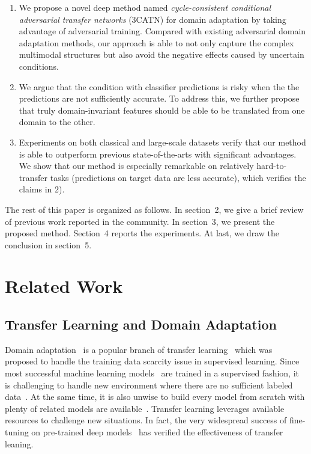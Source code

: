 \documentclass[sigconf]{acmart}
\begin{document}
\begin{enumerate}[1)]
\item We propose a novel deep method named {\it cycle-consistent conditional adversarial transfer networks} (3CATN) for domain adaptation by taking advantage of adversarial training. Compared with existing adversarial domain adaptation methods, our approach is able to not only capture the complex multimodal structures but also avoid the negative effects caused by uncertain conditions.
\item We argue that the condition with classifier predictions is risky when the the predictions are not sufficiently accurate. To address this, we further propose that truly domain-invariant features should be able to be translated from one domain to the other.
\item Experiments on both classical and large-scale datasets verify that our method is able to outperform previous state-of-the-arts with significant advantages. We show that our method is especially remarkable on relatively hard-to-transfer tasks (predictions on target data are less accurate), which verifies the claims in 2).
\end{enumerate}

The rest of this paper is organized as follows. In section~2, we give a brief review of previous work reported in the community. In section~3, we present the proposed method. Section~4 
reports the experiments. At last, we draw the conclusion in section~5.

\section{Related Work}


\subsection{Transfer Learning and Domain Adaptation}
Domain adaptation~\cite{pan2011domain,ganin2014unsupervised,li2016joint,bousmalis2017unsupervised,long2018conditional,li2019locality} is a popular branch of transfer learning~\cite{pan2010survey,li2018transfer} which was proposed to handle the training data scarcity issue in supervised learning. Since most successful machine learning models~\cite{he2016deep,krizhevsky2012imagenet} are trained in a supervised fashion, it is challenging to handle new environment where there are no sufficient labeled data~\cite{xian2017zero,li2017two}. At the same time, it is also unwise to build every model from scratch with plenty of related models are available~\cite{pan2010survey}. Transfer learning leverages available resources to challenge new situations. In fact, the very widespread success of fine-tuning on pre-trained deep models~\cite{he2016deep,krizhevsky2012imagenet} has verified the effectiveness of transfer leaning.  
\end{document}
